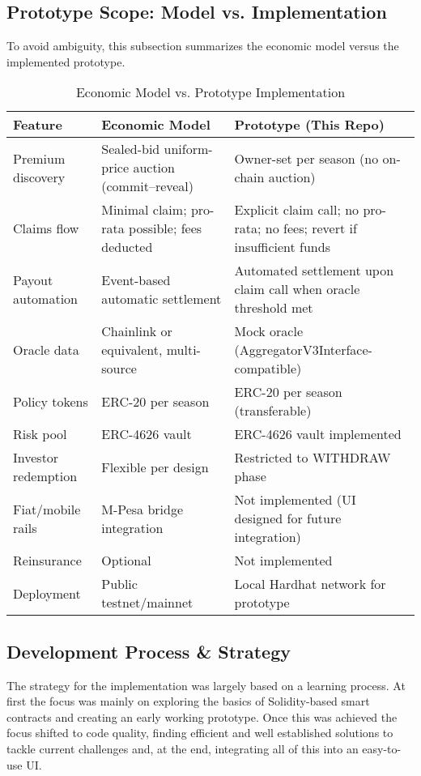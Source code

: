 \documentclass[11pt,a4paper]{article}
\begin{document}
		\subsection{Prototype Scope: Model vs. Implementation}\label{subsec:model-vs-prototype}
		To avoid ambiguity, this subsection summarizes the economic model versus the implemented prototype.
		\begin{table}[htbp]
		\centering
		\caption{Economic Model vs. Prototype Implementation}
		\label{tab:model-vs-prototype}
		\begin{tabular}{|>{\raggedright\arraybackslash}p{}|>{\raggedright\arraybackslash}p{}|>{\raggedright\arraybackslash}p{}|}
		\hline
		\textbf{Feature} & \textbf{Economic Model} & \textbf{Prototype (This Repo)} \\
		\hline
		Premium discovery & Sealed-bid uniform-price auction (commit--reveal) & Owner-set per season (no on-chain auction) \\
		\hline
		Claims flow & Minimal claim; pro-rata possible; fees deducted & Explicit claim call; no pro-rata; no fees; revert if insufficient funds \\
		\hline
		Payout automation & Event-based automatic settlement & Automated settlement upon claim call when oracle threshold met \\
		\hline
		Oracle data & Chainlink or equivalent, multi-source & Mock oracle (AggregatorV3Interface-compatible) \\
		\hline
		Policy tokens & ERC-20 per season & ERC-20 per season (transferable) \\
		\hline
		Risk pool & ERC-4626 vault & ERC-4626 vault implemented \\
		\hline
		Investor redemption & Flexible per design & Restricted to WITHDRAW phase \\
		\hline
		Fiat/mobile rails & M-Pesa bridge integration & Not implemented (UI designed for future integration) \\
		\hline
		Reinsurance & Optional & Not implemented \\
		\hline
		Deployment & Public testnet/mainnet & Local Hardhat network\footnotemark{} for prototype \\
		\hline
		\end{tabular}
		\end{table}


		\subsection{Development Process \& Strategy}\label{subsec:dev-strategy}
		The strategy for the implementation was largely based on a learning process.
		At first the focus was mainly on exploring the basics of Solidity-based smart contracts and creating an early working prototype.
		Once this was achieved the focus shifted to code quality, finding efficient and well established solutions to tackle current challenges and, at the end, integrating all of this into an easy-to-use UI.
\end{document}
